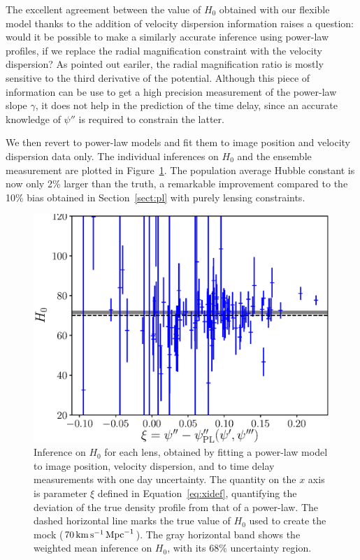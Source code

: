 \documentclass[usenatbib]{mnras}
\def\psiii{\psi''}
\def\Sref#1{Section~\ref{#1}\xspace}
\def\Fref#1{Figure~\ref{#1}\xspace}
\def\Eref#1{Equation~\ref{#1}\xspace}
\begin{document}
The excellent agreement between the value of $H_0$ obtained with our flexible model thanks to the addition of velocity dispersion information raises a question: would it be possible to make a similarly accurate inference using power-law profiles, if we replace the radial magnification constraint with the velocity dispersion?
As pointed out eariler, the radial magnification ratio is mostly sensitive to the third derivative of the potential. Although this piece of information can be use to get a high precision measurement of the power-law slope $\gamma$, it does not help in the prediction of the time delay, since an accurate knowledge of $\psiii$ is required to constrain the latter.

We then revert to power-law models and fit them to image position and velocity dispersion data only.
The individual inferences on $H_0$ and the ensemble measurement are plotted in \Fref{fig:pl_indH0_wdyn}.
The population average Hubble constant is now only 2\% larger than the truth, a remarkable improvement compared to the 10\% bias obtained in \Sref{sect:pl} with purely lensing constraints.
%
\begin{figure}
 \includegraphics[width=\columnwidth]{pl_impos_dyn_individual_H0.eps}
 \caption{Inference on $H_0$ for each lens, obtained by fitting a power-law model to image position, velocity dispersion, and to time delay measurements with one day uncertainty.
The quantity on the $x$ axis is parameter $\xi$ defined in \Eref{eq:xidef}, quantifying the deviation of the true density profile from that of a power-law.
The dashed horizontal line marks the true value of $H_0$ used to create the mock ($70\,\rm{km}\,\rm{s}^{-1}\,\rm{Mpc}^{-1}$).
The gray horizontal band shows the weighted mean inference on $H_0$, with its 68\% uncertainty region.
}
 \label{fig:pl_indH0_wdyn}
\end{figure}
%
\end{document}
